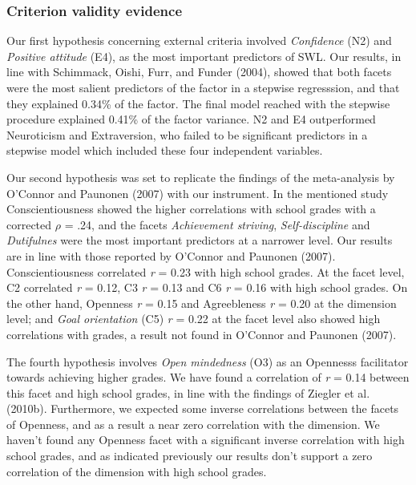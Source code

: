 \documentclass[,man,floatsintext]{apa6}
\theoremstyle{definition}
\theoremstyle{definition}
\theoremstyle{definition}
\theoremstyle{remark}
\begin{document}
\hypertarget{criterion-validity-evidence-1}{%
\subsubsection{Criterion validity
evidence}\label{criterion-validity-evidence-1}}

Our first hypothesis concerning external criteria involved
\emph{Confidence} (N2) and \emph{Positive attitude} (E4), as the most
important predictors of SWL. Our results, in line with Schimmack, Oishi,
Furr, and Funder (2004), showed that both facets were the most salient
predictors of the factor in a stepwise regresssion, and that they
explained 0.34\% of the factor. The final model reached with the
stepwise procedure explained 0.41\% of the factor variance. N2 and E4
outperformed Neuroticism and Extraversion, who failed to be significant
predictors in a stepwise model which included these four independent
variables.

Our second hypothesis was set to replicate the findings of the
meta-analysis by O'Connor and Paunonen (2007) with our instrument. In
the mentioned study Conscientiousness showed the higher correlations
with school grades with a corrected \(\rho\) = .24, and the facets
\emph{Achievement striving}, \emph{Self-discipline} and
\emph{Dutifulnes} were the most important predictors at a narrower
level. Our results are in line with those reported by O'Connor and
Paunonen (2007). Conscientiousness correlated \emph{r} = 0.23 with high
school grades. At the facet level, C2 correlated \emph{r} = 0.12, C3
\emph{r} = 0.13 and C6 \emph{r} = 0.16 with high school grades. On the
other hand, Openness \emph{r} = 0.15 and Agreebleness \emph{r} = 0.20 at
the dimension level; and \emph{Goal orientation} (C5) \emph{r} = 0.22 at
the facet level also showed high correlations with grades, a result not
found in O'Connor and Paunonen (2007).

The fourth hypothesis involves \emph{Open mindedness} (O3) as an
Opennesss facilitator towards achieving higher grades. We have found a
correlation of \emph{r} = 0.14 between this facet and high school
grades, in line with the findings of Ziegler et al. (2010b).
Furthermore, we expected some inverse correlations between the facets of
Openness, and as a result a near zero correlation with the dimension. We
haven't found any Openness facet with a significant inverse correlation
with high school grades, and as indicated previously our results don't
support a zero correlation of the dimension with high school grades.
\end{document}
